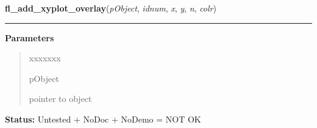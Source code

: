 \hspace{.8\funcindent}\begin{boxedminipage}{\funcwidth}

    \raggedright \textbf{fl\_add\_xyplot\_overlay}(\textit{pObject}, \textit{idnum}, \textit{x}, \textit{y}, \textit{n}, \textit{colr})

    \vspace{-1.5ex}

    \rule{\textwidth}{0.5\fboxrule}
\setlength{\parskip}{2ex}
\setlength{\parskip}{1ex}
      \textbf{Parameters}
      \vspace{-1ex}

      \begin{quote}
        \begin{Ventry}{xxxxxxx}

          \item[pObject]

          pointer to object

        \end{Ventry}

      \end{quote}

\textbf{Status:} Untested + NoDoc + NoDemo = NOT OK



    \end{boxedminipage}

    \label{xformslib:library:fl_add_xyplot_overlay_file}

    \vspace{0.5ex}

